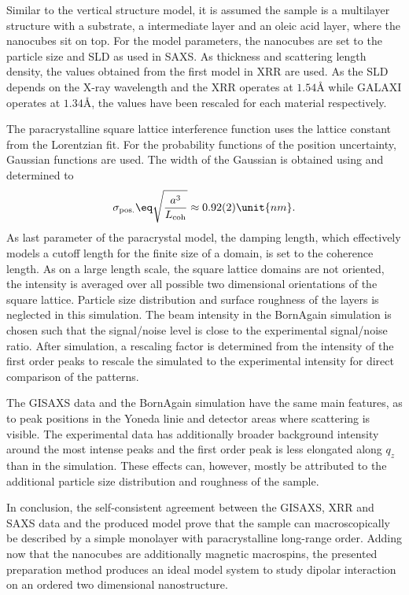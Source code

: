 \documentclass[\main/dresen_thesis.tex]{subfiles}
\begin{document}
  Similar to the vertical structure model, it is assumed the sample is a multilayer structure with a  substrate, a  intermediate layer and an oleic acid layer, where the nanocubes sit on top.
  For the model parameters, the nanocubes are set to the particle size and SLD as used in SAXS.
  As thickness and scattering length density, the values obtained from the first model in XRR are used.
  As the SLD depends on the X-ray wavelength and the XRR operates at $1.54 \unit{\angstrom}$ while GALAXI operates at $1.34 \unit{\angstrom}$, the values have been rescaled for each material respectively.

  The paracrystalline square lattice interference function uses the lattice constant from the Lorentzian fit.
  For the probability functions of the position uncertainty, Gaussian functions are used. 
  The width of the Gaussian is obtained using  and determined to
  \begin{align}
    \sigma_\mathrm{pos.} \eq \sqrt{\frac{a^3}{L_\mathrm{coh}}} \approx 0.92(2) \unit{nm}.
  \end{align}
  As last parameter of the paracrystal model, the damping length, which effectively models a cutoff length for the finite size of a domain, is set to the coherence length.
  As on a large length scale, the square lattice domains are not oriented, the intensity is averaged over all possible two dimensional orientations of the square lattice.
  Particle size distribution and surface roughness of the layers is neglected in this simulation.
  The beam intensity in the BornAgain simulation is chosen such that the signal/noise level is close to the experimental signal/noise ratio.
  After simulation, a rescaling factor is determined from the intensity of the first order peaks to rescale the simulated to the experimental intensity for direct comparison of the patterns.

  The GISAXS data and the BornAgain simulation have the same main features, as to peak positions in the Yoneda linie and detector areas where scattering is visible.
  The experimental data has additionally broader background intensity around the most intense peaks and the first order peak is less elongated along $\mathit{q_z}$ than in the simulation.
  These effects can, however, mostly be attributed to the additional particle size distribution and roughness of the sample.

  In conclusion, the self-consistent agreement between the GISAXS, XRR and SAXS data and the produced model prove that the sample can macroscopically be described by a simple monolayer with paracrystalline long-range order.
  Adding now that the nanocubes are additionally magnetic macrospins, the presented preparation method produces an ideal model system to study dipolar interaction on an ordered two dimensional nanostructure.
\end{document}
